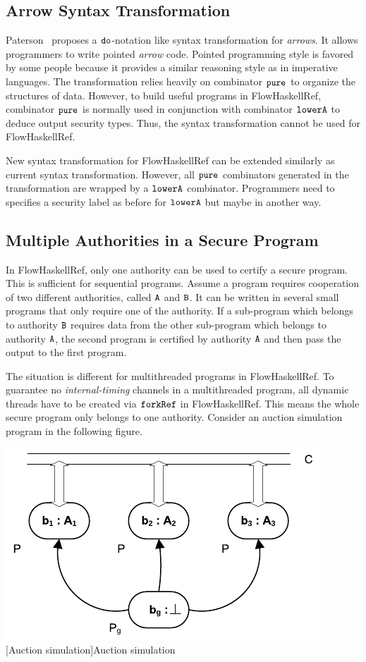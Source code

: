 \documentclass[a4paper]{report}
\newcommand{\co}[1]{$\cod{#1}$}
\begin{document}
\subsection{Arrow Syntax Transformation}
Paterson~\cite{Paterson:ICFP01} proposes a \co{do}-notation like syntax transformation
for {\em arrows}. It allows programmers to write pointed {\em arrow} code. 
Pointed programming style is favored by some people because it provides a similar
reasoning style as in imperative languages.
The transformation relies heavily on combinator \co{pure} to organize the structures of data. 
However, to build useful programs in FlowHaskellRef, combinator \co{pure} is normally used in 
conjunction with combinator \co{lowerA} to deduce output security types. Thus, the syntax transformation 
cannot be used for FlowHaskellRef. 

New syntax transformation for FlowHaskellRef can be extended similarly as current syntax transformation.
However, all \co{pure} combinators generated in the transformation are wrapped by a \co{lowerA} 
combinator. Programmers need to specifies a security label as before for \co{lowerA} but maybe in
another way.

\subsection{Multiple Authorities in a Secure Program}
In FlowHaskellRef, only one authority can be used to certify a secure program. This is sufficient for
sequential programs. Assume a program requires cooperation of two different authorities, 
called \co{A} and \co{B}. It can be written in several small programs that only require one of the authority.
If a sub-program which belongs to authority \co{B} requires data from the other sub-program which belongs to
authority \co{A}, the second program is certified by authority \co{A} and then pass the output to the
first program. 

The situation is different for multithreaded programs in FlowHaskellRef. To guarantee no {\em internal-timing}
channels in a multithreaded program, all dynamic threads have to be created via \co{forkRef} in 
FlowHaskellRef. This means the whole secure program only belongs to one authority. Consider an auction simulation
program in the following figure. 

\begin{center}
\includegraphics[scale=0.9]{bidder.pdf} \\
[Auction simulation]{Auction simulation}
\end{center}
\end{document}
